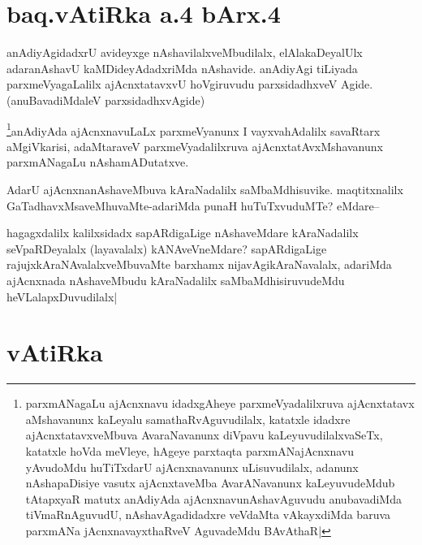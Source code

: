 \section*{baq.vAtiRka a.4 bArx.4}


\begin{artha}
anAdiyAgidadxrU avideyxge nAshavilalxveMbudilalx, elAlakaDeyalUlx adaranAshavU kaMDideyAdadxriMda nAshavide. anAdiyAgi tiLiyada parxmeVyagaLalilx ajAcnxtatavxvU hoVgiruvudu parxsidadhxveV Agide.(anuBavadiMdaleV parxsidadhxvAgide)
\end{artha}


\begin{artha}
\footnote{parxmANagaLu ajAcnxnavu idadxgAheye parxmeVyadalilxruva ajAcnxtatavx aMshavanunx kaLeyalu samathaRvAguvudilalx, katatxle idadxre ajAcnxtatavxveMbuva AvaraNavanunx diVpavu kaLeyuvudilalxvaSeTx, katatxle hoVda meVleye, hAgeye parxtaqta parxmANajAcnxnavu yAvudoMdu huTiTxdarU ajAcnxnavanunx uLisuvudilalx, adanunx nAshapaDisiye vasutx ajAcnxtaveMba AvarANavanunx kaLeyuvudeMdub tAtapxyaR matutx anAdiyAda ajAcnxnavunAshavAguvudu anubavadiMda tiVmaRnAguvudU, nAshavAgadidadxre veVdaMta vAkayxdiMda baruva parxmANa jAcnxnavayxthaRveV AguvadeMdu BAvAthaR|}anAdiyAda ajAcnxnavuLaLx parxmeVyanunx I vayxvahAdalilx  savaRtarx aMgiVkarisi, adaMtaraveV parxmeVyadalilxruva ajAcnxtatAvxMshavanunx parxmANagaLu nAshamADutatxve.
\end{artha}

\begin{artha}
AdarU ajAcnxnanAshaveMbuva kAraNadalilx saMbaMdhisuvike. maqtitxnalilx GaTadhavxMsaveMhuvaMte-adariMda punaH huTuTxvuduMTe? eMdare--
\end{artha}

\begin{artha}
hagagxdalilx kalilxsidadx sapARdigaLige nAshaveMdare kAraNadalilx seVpaRDeyalalx (layavalalx) kANAveVneMdare? sapARdigaLige rajujxkAraNAvalalxveMbuvaMte barxhamx nijavAgikAraNavalalx, adariMda ajAcnxnada nAshaveMbudu kAraNadalilx saMbaMdhisiruvudeMdu heVLalapxDuvudilalx|
\end{artha}

\section*{vAtiRka}

